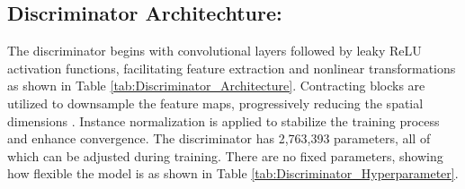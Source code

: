 \documentclass[UKenglish,12pt]{master-style}
\begin{document}
\subsection{Discriminator Architechture:} The discriminator begins with convolutional layers followed by leaky ReLU activation functions, facilitating feature extraction and nonlinear transformations as shown in Table \ref{tab:Discriminator_Architecture}. Contracting blocks are utilized to downsample the feature maps, progressively reducing the spatial dimensions . Instance normalization is applied to stabilize the training process and enhance convergence. The discriminator has 2,763,393 parameters, all of which can be adjusted during training. There are no fixed parameters, showing how flexible the model is as shown in Table \ref{tab:Discriminator_Hyperparameter}.

\begin{table}[h]
\centering
\caption{Summary of Discriminator Architecture}
\label{tab:Discriminator_Architecture}
\end{table}
\end{document}
